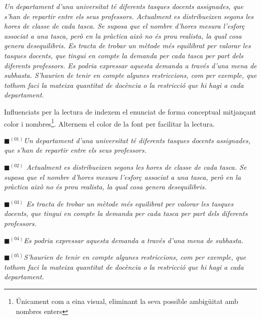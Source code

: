 \documentclass[10pt]{proc}
\begin{document}
\begin{tcolorbox}[colback=black!1,title=\textbf{Enunciat del problema},coltitle=black,colbacktitle=black!10]
\textit{
Un departament d'una universitat té diferents tasques docents assignades, que s'han de repartir entre els seus professors. Actualment es distribueixen segons les hores de classe de cada tasca. Se suposa que el nombre d'hores mesura l'esforç associat a una tasca, però en la pràctica això no és prou realista, la qual cosa genera desequilibris. Es tracta de trobar un mètode més equilibrat per valorar les tasques docents, que tingui en compte la demanda per cada tasca per part dels diferents professors. Es podria expressar aquesta demanda a través d'una mena de subhasta. S'haurien de tenir en compte algunes restriccions, com per exemple, que tothom faci la mateixa quantitat de docència o la restricció que hi hagi a cada departament.
}
\end{tcolorbox}
Influenciats per la lectura de \cite{tah} indexem el enunciat de forma conceptual mitjançant color i nombres\footnote{Únicament com a eina visual, eliminant la seva possible ambigüitat amb nombres enters}. Alternem el color de la font per facilitar la lectura. 
\newline
\begin{tcolorbox}[colback=black!1,title=\textbf{Enunciat del problema},coltitle=black,colbacktitle=black!10]

\textit{{\color{cyan!60}$\blacksquare$}$^{(01)}${\color{black!80}Un departament d'una universitat té diferents tasques docents assignades, que s'han de repartir entre els seus professors.}}
 
\textit{{\color{blue!60}$\blacksquare$}$^{(02)}$ Actualment es distribueixen segons les hores de classe de cada tasca. Se suposa que el nombre d'hores mesura l'esforç associat a una tasca, però en la pràctica això no és prou realista, la qual cosa genera desequilibris.}

\textit{{\color{green!60}$\blacksquare$}$^{(03)}$ {\color{black!80}Es tracta de trobar un mètode més equilibrat per valorar les tasques docents, que tingui en compte la demanda per cada tasca per part dels diferents professors.}}
 
\textit{{\color{purple!60}$\blacksquare$}$^{(04)}$Es podria expressar aquesta demanda a través d'una mena de subhasta.}
 
\textit{{\color{violet!60}$\blacksquare$}$^{(05)}${\color{black!80}S'haurien de tenir en compte algunes restriccions, com per exemple, que tothom faci la mateixa quantitat de docència o la restricció que hi hagi a cada departament.}}

\end{tcolorbox}
\end{document}
